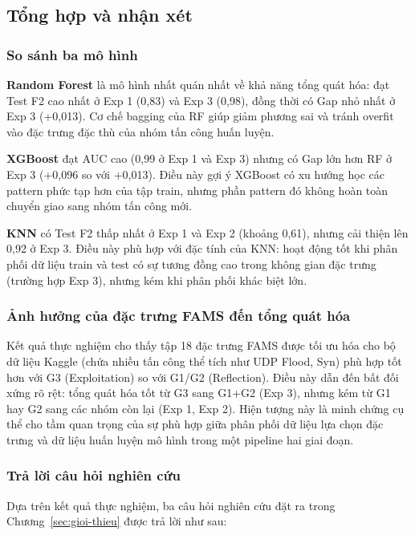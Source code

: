 \subsection{Tổng hợp và nhận xét}

\subsubsection{So sánh ba mô hình}

\textbf{Random Forest} là mô hình nhất quán nhất về khả năng tổng quát hóa: đạt Test F2 cao nhất ở Exp 1 (0,83) và Exp 3 (0,98), đồng thời có Gap nhỏ nhất ở Exp 3 (+0,013). Cơ chế bagging của RF giúp giảm phương sai và tránh overfit vào đặc trưng đặc thù của nhóm tấn công huấn luyện.

\textbf{XGBoost} đạt AUC cao (0,99 ở Exp 1 và Exp 3) nhưng có Gap lớn hơn RF ở Exp 3 (+0,096 so với +0,013). Điều này gợi ý XGBoost có xu hướng học các pattern phức tạp hơn của tập train, nhưng phần pattern đó không hoàn toàn chuyển giao sang nhóm tấn công mới.

\textbf{KNN} có Test F2 thấp nhất ở Exp 1 và Exp 2 (khoảng 0,61), nhưng cải thiện lên 0,92 ở Exp 3. Điều này phù hợp với đặc tính của KNN: hoạt động tốt khi phân phối dữ liệu train và test có sự tương đồng cao trong không gian đặc trưng (trường hợp Exp 3), nhưng kém khi phân phối khác biệt lớn.

\subsubsection{Ảnh hưởng của đặc trưng FAMS đến tổng quát hóa}

Kết quả thực nghiệm cho thấy tập 18 đặc trưng FAMS được tối ưu hóa cho bộ dữ liệu Kaggle (chứa nhiều tấn công thể tích như UDP Flood, Syn) phù hợp tốt hơn với G3 (Exploitation) so với G1/G2 (Reflection). Điều này dẫn đến bất đối xứng rõ rệt: tổng quát hóa tốt từ G3 sang G1+G2 (Exp 3), nhưng kém từ G1 hay G2 sang các nhóm còn lại (Exp 1, Exp 2). Hiện tượng này là minh chứng cụ thể cho tầm quan trọng của sự phù hợp giữa phân phối dữ liệu lựa chọn đặc trưng và dữ liệu huấn luyện mô hình trong một pipeline hai giai đoạn.

\subsubsection{Trả lời câu hỏi nghiên cứu}

Dựa trên kết quả thực nghiệm, ba câu hỏi nghiên cứu đặt ra trong Chương~\ref{sec:gioi-thieu} được trả lời như sau:

